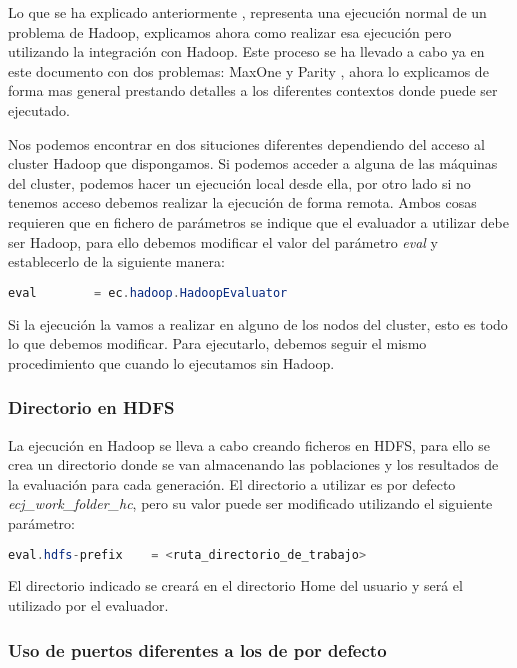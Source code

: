 Lo que se ha explicado anteriormente , representa una ejecuci\'on normal de un problema de Hadoop, explicamos ahora como realizar esa ejecuci\'on pero utilizando la integraci\'on con Hadoop. Este proceso se ha llevado a cabo ya en este documento con dos problemas: MaxOne  y Parity , ahora lo explicamos de forma mas general prestando detalles a los diferentes contextos donde puede ser ejecutado.

Nos podemos encontrar en dos situciones diferentes dependiendo del acceso al cluster Hadoop que dispongamos. Si podemos acceder a alguna de las m\'aquinas del cluster, podemos hacer un ejecuci\'on local desde ella, por otro lado si no tenemos acceso debemos realizar la ejecuci\'on de forma remota. Ambos cosas requieren que en fichero de par\'ametros se indique que el evaluador a utilizar debe ser Hadoop, para ello debemos modificar el valor del par\'ametro \textit{eval} y establecerlo de la siguiente manera:

\begin{lstlisting}[language=Java]
eval		= ec.hadoop.HadoopEvaluator
\end{lstlisting}

Si la ejecuci\'on la vamos a realizar en alguno de los nodos del cluster, esto es todo lo que debemos modificar. Para ejecutarlo, debemos seguir el mismo procedimiento que cuando lo ejecutamos sin Hadoop.

\subsubsection{Directorio en HDFS}

La ejecuci\'on en Hadoop se lleva a cabo creando ficheros en HDFS, para ello se crea un directorio donde se van almacenando las poblaciones y los resultados de la evaluaci\'on para cada generaci\'on. El directorio a utilizar es por defecto \textit{ecj\_work\_folder\_hc}, pero su valor puede ser modificado utilizando el siguiente par\'ametro:

\begin{lstlisting}[language=Java]
eval.hdfs-prefix	= <ruta_directorio_de_trabajo>
\end{lstlisting}

El directorio indicado se crear\'a en el directorio Home del usuario y ser\'a el utilizado por el evaluador.

\subsubsection{Uso de puertos diferentes a los de por defecto}

